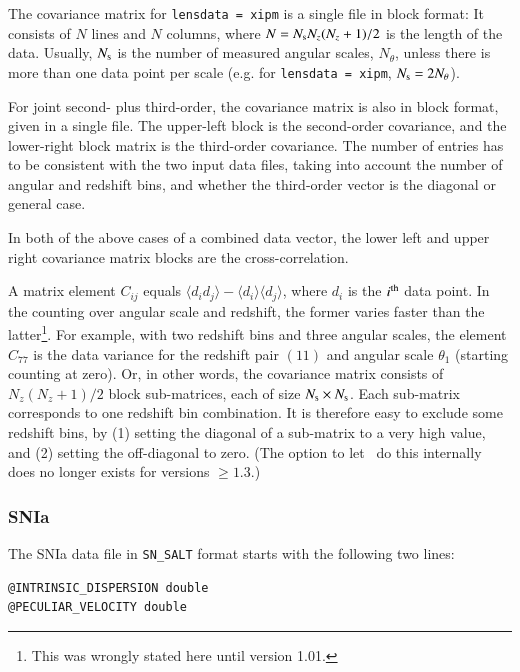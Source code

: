 \documentclass[11pt, chapterprefix, headsepline]{scrartcl}
\begin{document}
\begin{appendix}
The covariance matrix for \texttt{lensdata = xipm} is a single file in block format: It
consists of $N$ lines and $N$ columns, where $N = N_{\rm s} N_z (N_z + 1)/2$ is
the length of the data. Usually, $N_{\rm s}$ is the number of measured angular
scales, $N_\theta$, unless there is more than one data point per scale (e.g.
for \texttt{lensdata = xipm}, $N_{\rm s} = 2 N_\theta$).

For joint second- plus third-order, the covariance matrix is also in block
format, given in a single file. The upper-left block is the second-order
covariance, and the lower-right block matrix is the third-order covariance. The
number of entries has to be consistent with the two input data files, taking
into account the number of angular and redshift bins, and whether the
third-order vector is the diagonal or general case.

In both of the above cases of a combined data vector, the lower left and upper
right covariance matrix blocks are the cross-correlation. 

A matrix element $C_{ij}$ equals $\langle d_i d_j \rangle - \langle d_i \rangle
\langle d_j \rangle$, where $d_i$ is the $i^{\rm th}$ data point. In the
counting over angular scale and redshift, the former varies faster than the
latter\footnote{This was wrongly stated here until version 1.01.}. For example,
with two redshift bins and three angular scales, the element $C_{77}$ is the
data variance for the redshift pair $(11)$ and angular scale $\theta_1$
(starting counting at zero). Or, in other words, the covariance matrix consists
of $N_z (N_z + 1) / 2$ block sub-matrices, each of size $N_{\rm s} \times
N_{\rm s}$. Each sub-matrix corresponds to one redshift bin combination. It is
therefore easy to exclude some redshift bins, by (1) setting the diagonal of a
sub-matrix to a very high value, and (2) setting the off-diagonal to zero. (The
option to let \CosmoPMC\ do this internally does no longer exists for versions
$\ge 1.3$.) 

\subsubsection{SNIa}

The SNIa data file in \texttt{SN\_SALT} format starts with the
following two lines:

\begin{verbatim}
@INTRINSIC_DISPERSION double
@PECULIAR_VELOCITY double
\end{verbatim}


\end{appendix}
\end{document}
